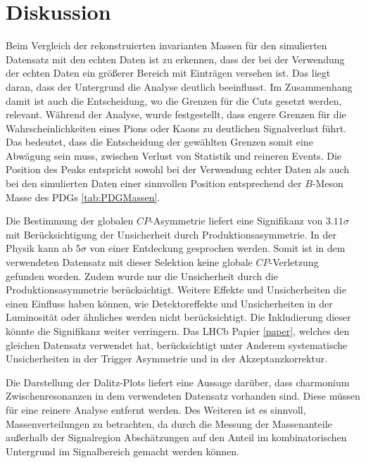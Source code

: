 \section{Diskussion}
\label{sec:discussion}

Beim Vergleich der rekonstruierten invarianten Massen für den simulierten Datensatz 
mit den echten Daten ist zu erkennen, dass der bei der Verwendung der echten Daten 
ein größerer Bereich mit Einträgen versehen ist. Das liegt daran, dass der Untergrund 
die Analyse deutlich beeinflusst. Im Zusammenhang damit ist auch die Entscheidung, wo 
die Grenzen für die Cuts gesetzt werden, relevant. Während der Analyse, wurde 
festgestellt, dass engere Grenzen für die Wahrscheinlichkeiten eines Pions oder 
Kaons zu deutlichen Signalverlust führt. Das bedeutet, dass die Entscheidung der 
gewählten Grenzen somit eine Abwägung sein muss, zwischen Verlust von Statistik 
und reineren Events. Die Position des Peaks entspricht sowohl bei der Verwendung 
echter Daten als auch bei den simulierten Daten einer sinnvollen Position entsprechend 
der $B$-Meson Masse des PDGs \ref{tab:PDGMassen}. \par 

Die Bestimmung der globalen $CP$-Asymmetrie liefert eine Signifikanz von 
$3.11\sigma$ mit Berücksichtigung der Unsicherheit durch 
Produktionsasymmetrie. In der Physik kann ab $5\sigma$ von einer Entdeckung 
gesprochen werden. Somit ist in dem verwendeten Datensatz mit dieser 
Selektion keine globale $CP$-Verletzung gefunden worden. Zudem wurde nur die 
Unsicherheit durch die Produktionsasymmetrie berücksichtigt. Weitere Effekte 
und Unsicherheiten die einen Einfluss haben können, wie Detektoreffekte und 
Unsicherheiten in der Luminosität oder ähnliches werden nicht berücksichtigt. 
Die Inkludierung dieser könnte die Signifikanz weiter verringern. Das LHCb 
Papier \ref{paper}, welches den gleichen Datensatz verwendet hat, berücksichtigt 
unter Anderem systematische Unsicherheiten in der Trigger Asymmetrie und 
in der Akzeptanzkorrektur. \par 

Die Darstellung der Dalitz-Plots liefert eine Aussage darüber, dass charmonium 
Zwischenresonanzen in dem verwendeten Datensatz vorhanden sind. Diese müssen 
für eine reinere Analyse entfernt werden. Des Weiteren ist es sinnvoll, 
Massenverteilungen zu betrachten, da durch die Messung der Massenanteile 
außerhalb der Signalregion Abschätzungen auf den Anteil im kombinatorischen 
Untergrund im Signalbereich gemacht werden können.\par 

